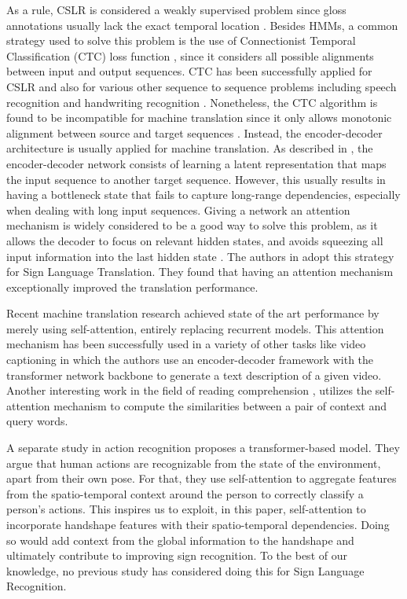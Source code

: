 \documentclass[a4paper,conference]{IEEEtran}
\begin{document}
As a rule, CSLR is considered a weakly supervised problem since gloss annotations usually lack the exact temporal location \cite{Cui_2017_CVPR}. Besides HMMs, a common strategy used to solve this problem is the use of Connectionist Temporal Classification (CTC) loss function \cite{graves2006connectionist}, since it considers all possible alignments between input and output sequences. CTC has been successfully applied for CSLR \cite{camgoz2017subunets,Cui_2017_CVPR} and also for various other sequence to sequence problems including speech recognition \cite{graves2013speech} and handwriting recognition \cite{graves2008novel}.
Nonetheless, the CTC algorithm is found to be incompatible for machine translation since it only allows monotonic alignment between source and target sequences \cite{hannun2017sequence}. Instead, the encoder-decoder architecture is usually applied for machine translation. As described in \cite{cho2014learning}, the encoder-decoder network consists of learning a latent representation that maps the input sequence to another target sequence. However, this usually results in having a bottleneck state that fails to capture long-range dependencies, especially when dealing with long input sequences. Giving a network an attention mechanism is widely considered to be a good way to solve this problem, as it allows the decoder to focus on relevant hidden states, and avoids squeezing all input information into the last hidden state \cite{bahdanau2014neural}. The authors in \cite{cihan2018neural} adopt this strategy for Sign Language Translation. They found that having an attention mechanism \cite{bahdanau2014neural} exceptionally improved the translation performance.
	
Recent machine translation research \cite{vaswani2017attention} achieved state of the art performance by merely using self-attention, entirely replacing recurrent models.
This attention mechanism has been successfully used in a variety of other tasks like video captioning \cite{chen2018tvt} in which the authors use an encoder-decoder framework with the transformer network backbone to generate a text description of a given video. Another interesting work in the field of reading comprehension \cite{yu2018qanet}, utilizes the self-attention mechanism to compute the similarities between a pair of context and query words. 

A separate study in action recognition \cite{girdhar2019video} proposes a transformer-based model. They argue that human actions are recognizable from the state of the environment, apart from their own pose. For that, they use self-attention to aggregate features from the spatio-temporal context around the person to correctly classify a person's actions. This inspires us to exploit, in this paper, self-attention to incorporate handshape features with their spatio-temporal dependencies. Doing so would add context from the global information to the handshape and ultimately contribute to improving sign recognition. To the best of our knowledge, no previous study has considered doing this for Sign Language Recognition.
\end{document}
